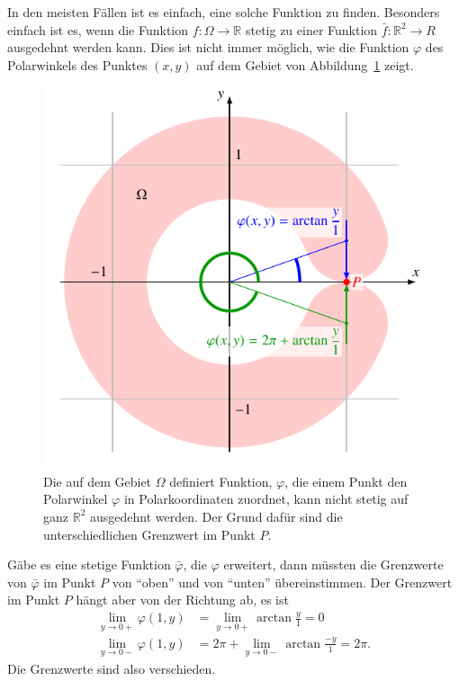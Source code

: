 In den meisten Fällen ist es einfach, eine solche Funktion zu
finden.
Besonders einfach ist es, wenn die Funktion $f\colon\Omega\to\mathbb R$
stetig zu einer Funktion $\bar{f}\colon\mathbb R^2\to R$ ausgedehnt
werden kann.
Dies ist nicht immer möglich, wie die Funktion $\varphi$ des Polarwinkels
des Punktes $(x,y)$ auf dem Gebiet von
Abbildung~\ref{buch:pde:figure:ringgebiet} zeigt.
\begin{figure}
\centering
\includegraphics{chapters/70-pde/images/ringgebiet.pdf}
\caption{Die auf dem Gebiet $\Omega$ definiert Funktion, $\varphi$,
die einem Punkt den Polarwinkel $\varphi$ in Polarkoordinaten zuordnet,
kann nicht stetig auf ganz $\mathbb R^2$ ausgedehnt werden.
Der Grund dafür sind die unterschiedlichen Grenzwert im Punkt $P$.
\label{buch:pde:figure:ringgebiet}}
\end{figure}
Gäbe es eine stetige Funktion $\bar{\varphi}$, die $\varphi$ erweitert, dann
müssten die Grenzwerte von $\bar{\varphi}$ im Punkt $P$ von ``oben'' und
von ``unten'' übereinstimmen.
Der Grenzwert im Punkt $P$ hängt aber von der Richtung ab,
es ist
\begin{align*}
\lim_{y\to 0+}\varphi(1,y) &= \lim_{y\to 0+}\arctan\frac{y}{1} = 0
\\
\lim_{y\to 0-}\varphi(1,y) &= 2\pi + \lim_{y\to 0-}\arctan\frac{-y}{1} = 2\pi.
\end{align*}
Die Grenzwerte sind also verschieden.

